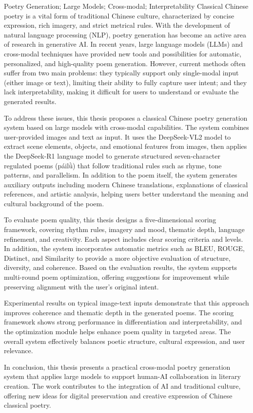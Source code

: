 \begin{enabstract}{Poetry Generation; Large Models; Cross-modal; Interpretability}
  Classical Chinese poetry is a vital form of traditional Chinese culture, characterized by concise expression, rich imagery, and strict metrical rules. With the development of natural language processing (NLP), poetry generation has become an active area of research in generative AI. In recent years, large language models (LLMs) and cross-modal techniques have provided new tools and possibilities for automatic, personalized, and high-quality poem generation. However, current methods often suffer from two main problems: they typically support only single-modal input (either image or text), limiting their ability to fully capture user intent; and they lack interpretability, making it difficult for users to understand or evaluate the generated results.

To address these issues, this thesis proposes a classical Chinese poetry generation system based on large models with cross-modal capabilities. The system combines user-provided images and text as input. It uses the DeepSeek-VL2 model to extract scene elements, objects, and emotional features from images, then applies the DeepSeek-R1 language model to generate structured seven-character regulated poems (páilǜ) that follow traditional rules such as rhyme, tone patterns, and parallelism. In addition to the poem itself, the system generates auxiliary outputs including modern Chinese translations, explanations of classical references, and artistic analysis, helping users better understand the meaning and cultural background of the poem.

To evaluate poem quality, this thesis designs a five-dimensional scoring framework, covering rhythm rules, imagery and mood, thematic depth, language refinement, and creativity. Each aspect includes clear scoring criteria and levels. In addition, the system incorporates automatic metrics such as BLEU, ROUGE, Distinct, and Similarity to provide a more objective evaluation of structure, diversity, and coherence. Based on the evaluation results, the system supports multi-round poem optimization, offering suggestions for improvement while preserving alignment with the user's original intent.

Experimental results on typical image-text inputs demonstrate that this approach improves coherence and thematic depth in the generated poems. The scoring framework shows strong performance in differentiation and interpretability, and the optimization module helps enhance poem quality in targeted areas. The overall system effectively balances poetic structure, cultural expression, and user relevance.

In conclusion, this thesis presents a practical cross-modal poetry generation system that applies large models to support human-AI collaboration in literary creation. The work contributes to the integration of AI and traditional culture, offering new ideas for digital preservation and creative expression of Chinese classical poetry.

\end{enabstract}
